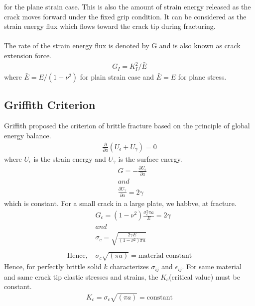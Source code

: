 \documentclass[12pt]{article}
\begin{document}
for the plane strain case. This is also the amount of strain energy released as the crack moves forward
under the fixed grip condition. It can be considered as the strain energy flux which flows toward the
crack tip during fracturing.
\\\\The rate of the strain energy flux is denoted by G and is also known as crack extension force.
\begin{align*}
    G_I = K_{I}^{2}/\bar{E} \tag{4} \label{4}
\end{align*}
where $\bar E = E/(1 - \nu^2)$ for plain strain case and $\bar{E} = E$ for plane stress.






\subsection{Griffith Criterion}
Griffith proposed the criterion of brittle fracture based on the principle of global energy balance.
\begin{align}
    \frac{\partial}{\partial a}(U_\epsilon + U_\gamma) = 0 \tag{5} \label{5}
\end{align}
where $U_\epsilon$  is the strain energy and $U_\gamma$ is the surface energy.
\begin{align*}
    &G = -\frac{\partial U_\epsilon}{\partial a} \\ &and \\ &\frac{\partial U_\gamma}{\partial a} = 2 \gamma
\end{align*}
which is constant. For a small crack in a large plate, we habbve, at fracture.
\begin{align*}
    &G_c = (1 - \nu ^ 2)\frac{\sigma_{c} ^ 2 \pi a}{E} = 2 \gamma \\ &and \\ &\sigma_c = \sqrt{\frac{2 \gamma E}{(1 - \nu ^ 2)\pi a } }
    \\\\\text{Hence, \ \ \ \ \ \ \ \ \ \ \ \ \ } & \sigma_c \sqrt{(\pi a)} = \text{material constant}
\end{align*}
Hence, for perfectly brittle solid $k$ characterizes $\sigma_{ij}$ and $\epsilon_{ij}$.
For same material and same crack tip elastic stresses and strains, the $K_c$(critical value) must be constant.
\begin{align*}
    K_c = \sigma_c \sqrt{(\pi a)} = \text {constant}
\end{align*}
\end{document}
